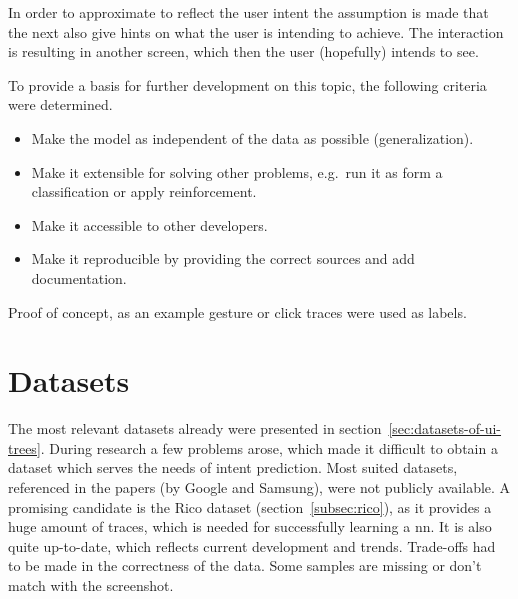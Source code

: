 In order to approximate to reflect the user intent the assumption is made that the next  also give hints on what the user is intending to achieve.
The interaction is resulting in another screen, which then the user (hopefully) intends to see.


To provide a basis for further development on this topic, the following criteria were determined.
\begin{itemize}
  \item Make the model as independent of the data as possible (generalization).
  \item Make it extensible for solving other problems, e.g.\ run it as form a classification or apply reinforcement.
  \item Make it accessible to other developers.
  \item Make it reproducible by providing the correct sources and add documentation.
\end{itemize}

Proof of concept, as an example gesture or click traces were used as labels.

\section{Datasets}

The most relevant datasets already were presented in section~\ref{sec:datasets-of-ui-trees}.
During research a few problems arose, which made it difficult to obtain a dataset which serves the needs of intent prediction.
Most suited datasets, referenced in the papers (by Google and Samsung), were not publicly available.
A promising candidate is the Rico dataset (section~\ref{subsec:rico}), as it provides a huge amount of traces, which is needed for successfully learning a \gls{nn}.
It is also quite up-to-date, which reflects current development and trends.
Trade-offs had to be made in the correctness of the data.
Some samples are missing or don't match with the screenshot.

